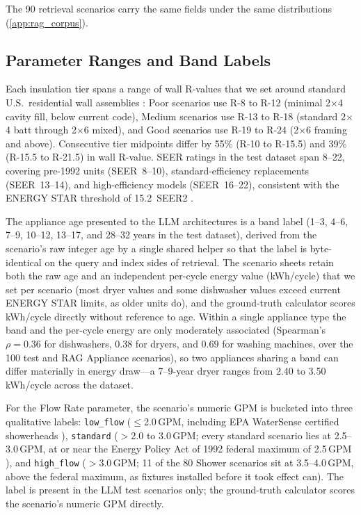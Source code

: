 \documentclass[11pt]{article}
\begin{document}
The 90 retrieval scenarios carry the same fields under the same distributions
(\ref{app:rag_corpus}).

\subsection{Parameter Ranges and Band Labels}
\label{app:parameter_ranges}

Each insulation tier spans a range of wall R-values that we set around standard U.S.\ residential wall assemblies \citep{cec_ja43_2013,energystar_insulation2023}: Poor scenarios use R-8 to R-12 (minimal 2$\times$4 cavity fill, below current code), Medium scenarios use R-13 to R-18 (standard 2$\times$4 batt through 2$\times$6 mixed), and Good scenarios use R-19 to R-24 (2$\times$6 framing and above). Consecutive tier midpoints differ by 55\% (R-10 to R-15.5) and 39\% (R-15.5 to R-21.5) in wall R-value. SEER ratings in the test dataset span 8--22, covering pre-1992 units (SEER~8--10), standard-efficiency replacements (SEER~13--14), and high-efficiency models (SEER~16--22), consistent with the ENERGY STAR threshold of 15.2~SEER2 \citep{energystar_ac2023}.

The appliance age presented to the LLM architectures is a band label (1--3, 4--6, 7--9, 10--12, 13--17, and 28--32 years in the test dataset), derived from the scenario's raw integer age by a single shared helper so that the label is byte-identical on the query and index sides of retrieval. The scenario sheets retain both the raw age and an independent per-cycle energy value (kWh/cycle) that we set per scenario (most dryer values and some dishwasher values exceed current ENERGY STAR limits, as older units do), and the ground-truth calculator scores kWh/cycle directly without reference to age. Within a single appliance type the band and the per-cycle energy are only moderately associated (Spearman's $\rho = 0.36$ for dishwashers, $0.38$ for dryers, and $0.69$ for washing machines, over the 100 test and RAG Appliance scenarios), so two appliances sharing a band can differ materially in energy draw---a 7--9-year dryer ranges from 2.40 to 3.50\,kWh/cycle across the dataset.

For the Flow Rate parameter, the scenario's numeric GPM is bucketed into three qualitative labels: \texttt{low\_flow} ($\le$2.0\,GPM, including EPA WaterSense certified showerheads \citep{epawatersense}), \texttt{standard} ($>$2.0 to 3.0\,GPM; every standard scenario lies at 2.5--3.0\,GPM, at or near the Energy Policy Act of 1992 federal maximum of 2.5\,GPM \citep{cfr430_32}), and \texttt{high\_flow} ($>$3.0\,GPM; 11 of the 80 Shower scenarios sit at 3.5--4.0\,GPM, above the federal maximum, as fixtures installed before it took effect can). The label is present in the LLM test scenarios only; the ground-truth calculator scores the scenario's numeric GPM directly.
\end{document}
